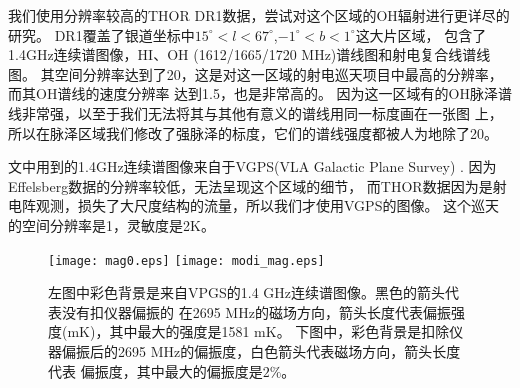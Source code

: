 我们使用分辨率较高的THOR DR1数据\citep{Beuther2016}，尝试对这个区域的OH辐射进行更详尽的研究。
DR1覆盖了银道坐标中$15^{\circ}<l<67^{\circ}$,$-1^{\circ}<b<1^{\circ}$这大片区域，
包含了1.4GHz连续谱图像，HI、OH (1612/1665/1720 MHz)谱线图和射电复合线谱线图。
其空间分辨率达到了20\as，这是对这一区域的射电巡天项目中最高的分辨率，而其OH谱线的速度分辨率
达到1.5\kms，也是非常高的。
因为这一区域有的OH脉泽谱线非常强，以至于我们无法将其与其他有意义的谱线用同一标度画在一张图
上，所以在脉泽区域我们修改了强脉泽的标度，它们的谱线强度都被人为地除了20。

文中用到的1.4GHz连续谱图像来自于VGPS(VLA Galactic Plane Survey) \citep{Stil2006}.
因为Effelsberg数据的分辨率较低，无法呈现这个区域的细节，
而THOR数据因为是射电阵观测，损失了大尺度结构的流量，所以我们才使用VGPS的图像。
这个巡天的空间分辨率是1\am，灵敏度是2K。

\begin{figure*}
   \centering
   \texttt{[image: mag0.eps]}
   \texttt{[image: modi\_mag.eps]}
   \caption{左图中彩色背景是来自VPGS的1.4 GHz连续谱图像。黑色的箭头代表没有扣仪器偏振的
   在2695 MHz的磁场方向，箭头长度代表偏振强度(mK)，其中最大的强度是1581 mK。
   下图中，彩色背景是扣除仪器偏振后的2695 MHz的偏振度，白色箭头代表磁场方向，箭头长度代表
   偏振度，其中最大的偏振度是$2\%$。
   }
\label{fig:mag}
\end{figure*}

